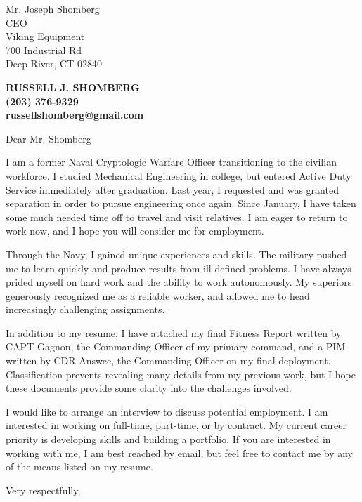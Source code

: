 \documentclass[10pt]{letter} %
\begin{document}
\signature{Russell J. Shomberg}                  %
\longindentation=0pt                       %
\let\raggedleft\raggedright                %
 
\begin{letter}
  {Mr. Joseph Shomberg \\
    CEO \\
    Viking Equipment \\
    700 Industrial Rd \\
    Deep River, CT 02840} 

\begin{center}
  \large\bf RUSSELL J. SHOMBERG \\
  (203) 376-9329 \\
  russellshomberg@gmail.com \\ 
\end{center} 


 
\opening{Dear Mr. Shomberg} 
 
\noindent I am a former Naval Cryptologic Warfare Officer transitioning to the civilian workforce. I studied Mechanical Engineering in college, but entered Active Duty Service immediately after graduation. Last year, I requested and was granted separation in order to pursue engineering once again. Since January, I have taken some much needed time off to travel and visit relatives. I am eager to return to work now, and I hope you will consider me for employment.

\noindent Through the Navy, I gained unique experiences and skills. The military pushed me to learn quickly and produce results from ill-defined problems. I have always prided myself on hard work and the ability to work autonomously. My superiors generously recognized me as a reliable worker, and allowed me to head increasingly challenging assignments.

\noindent In addition to my resume, I have attached my final Fitness Report written by CAPT Gagnon, the Commanding Officer of my primary command, and a PIM written by CDR Answee, the Commanding Officer on my final deployment. Classification prevents revealing many details from my previous work, but I hope these documents provide some clarity into the challenges involved.

\noindent I would like to arrange an interview to discuss potential employment. I am interested in working on full-time, part-time, or by contract. My current career priority is developing skills and building a portfolio. If you are interested in working with me, I am best reached by email, but feel free to contact me by any of the  means listed on my resume.
 
\closing{Very respectfully,}
 
 

\end{letter}
 
\end{document}
